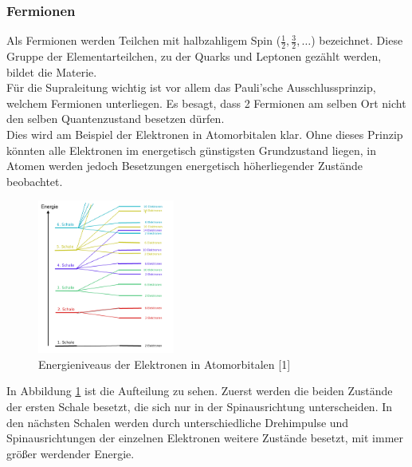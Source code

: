         \subsubsection{Fermionen}
Als Fermionen werden Teilchen mit halbzahligem Spin ($\frac{1}{2}, \frac{3}{2},
\dots$) bezeichnet. Diese Gruppe der Elementarteilchen, zu der Quarks und 
Leptonen gezählt werden, bildet die Materie.
\vspace{3pt}\\
Für die Supraleitung wichtig ist vor allem das Pauli'sche Ausschlussprinzip, 
welchem Fermionen unterliegen. Es besagt, dass 2 Fermionen am selben Ort nicht
den selben Quantenzustand besetzen dürfen.\\
Dies wird am Beispiel der Elektronen in Atomorbitalen klar. Ohne dieses Prinzip
könnten alle Elektronen im energetisch günstigsten Grundzustand liegen, in Atomen
werden jedoch Besetzungen energetisch höherliegender Zustände beobachtet.
\begin{figure}[h]
    \centering
    \includegraphics[width=0.4\textwidth]{Abb/energieniveaus-elektronen.jpg}
    \caption{Energieniveaus der Elektronen in Atomorbitalen [1]}
    \label{Abb:energieschema}
\end{figure}
In Abbildung \ref{Abb:energieschema} ist die Aufteilung zu sehen. Zuerst werden die
beiden Zustände der ersten Schale besetzt, die sich nur in der Spinausrichtung 
unterscheiden. In den nächsten Schalen werden durch unterschiedliche Drehimpulse 
und Spinausrichtungen der einzelnen Elektronen weitere Zustände besetzt, mit immer
größer werdender Energie.

